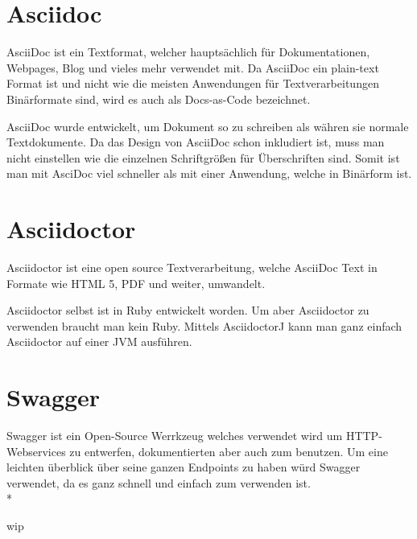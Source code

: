 \section{Asciidoc}
\author{David Ignjatovic}

AsciiDoc ist ein Textformat, welcher hauptsächlich für Dokumentationen, Webpages, Blog und vieles mehr verwendet mit.
Da AsciiDoc ein plain-text Format ist und nicht wie die meisten Anwendungen für Textverarbeitungen Binärformate sind, wird es auch als Docs-as-Code bezeichnet.

AsciiDoc wurde entwickelt, um Dokument so zu schreiben als währen sie normale Textdokumente. Da das Design von AsciiDoc schon inkludiert ist,
muss man nicht einstellen wie die einzelnen Schriftgrößen für Überschriften sind. Somit ist man mit AsciDoc viel schneller als mit einer Anwendung,
welche in Binärform ist.

\section{Asciidoctor}
\author{David Ignjatovic}

Asciidoctor ist eine open source Textverarbeitung, welche AsciiDoc Text in Formate wie HTML 5, PDF und weiter, umwandelt.

Asciidoctor selbst ist in Ruby entwickelt worden. Um aber Asciidoctor zu verwenden braucht man kein Ruby. Mittels AsciidoctorJ
kann man ganz einfach Asciidoctor auf einer JVM ausführen.

\section{Swagger}
\author{David Ignjatovic} 

Swagger ist ein Open-Source Werrkzeug welches verwendet wird um HTTP-Webservices zu entwerfen, dokumentierten aber auch zum benutzen. Um eine  leichten überblick über seine 
ganzen Endpoints zu haben würd Swagger verwendet, da es ganz schnell und einfach zum verwenden ist. \\*

wip



